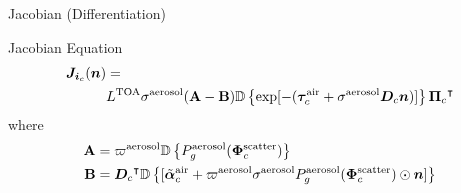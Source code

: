 \documentclass[compress,red,12pt]{beamer}
\newcommand{\vect}[1]{\bm{#1}}
\newcommand{\transpose}[1]{{#1}^\intercal}
\newcommand{\OpDiag}[1]{\mathbb{D}\left\{#1\right\}}
\begin{document}

\appendix

\begin{frame}[label=jacobian]{Jacobian (Differentiation)}
  \begin{block}{Jacobian Equation}
    \begin{align*}
      {\bm J}_{{\bm i}_c}({\bm n}) &= \\
      &L^{\rm TOA}{\sigma}^{\rm
        aerosol}({\bf A}-{\bf B}) \OpDiag{\exp[-(\vect{\tau}_c^{\rm air} +
        {\sigma}^{\rm aerosol} {\bm D}_c {\bm n})]}
      \transpose{{\vect{\Pi}}_c}
    \end{align*}
    where
    \begin{align*}
      {\bf A} &= \varpi^{\rm aerosol}
      \OpDiag{ P_g^{\rm aerosol}(\vect{\Phi}^{\rm scatter}_c)} \\
      {\bf B} &= \transpose{{\bm D}_c}
      \OpDiag{[\tilde{\vect{\alpha}}^{\rm air}_c + \varpi^{\rm
          aerosol}\sigma^{\rm aerosol} P^{\rm aerosol}_g(\vect{\Phi}^{\rm
          scatter}_c) \odot{\bm n}    ]}
    \end{align*}
  \end{block}
  \hfill\hyperlink{gradient}{}
\end{frame}

\end{document}
